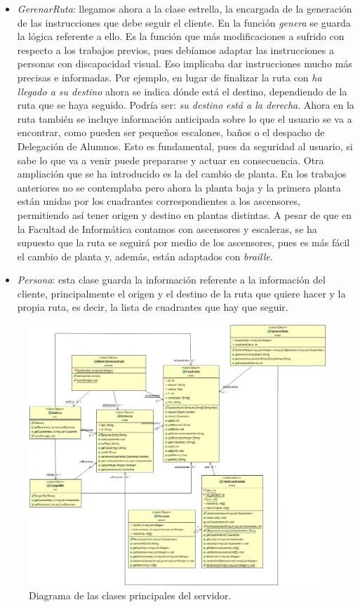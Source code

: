 \begin{itemize}
	\item \textit{GerenarRuta}: llegamos ahora a la clase estrella, la encargada de la generación de las instrucciones que debe seguir el cliente. En la función \textit{genera} se guarda la lógica referente a ello. Es la función que más modificaciones a sufrido con respecto a los trabajos previos, pues debíamos adaptar las instrucciones a personas con discapacidad visual. Eso implicaba dar instrucciones mucho más precisas e informadas. Por ejemplo, en lugar de finalizar la ruta con \textit{ha llegado a su destino} ahora se indica dónde está el destino, dependiendo de la ruta que se haya seguido. Podría ser: \textit{su destino está a la derecha}. Ahora en la ruta también se incluye información anticipada sobre lo que el usuario se va a encontrar, como pueden ser pequeños escalones, baños o el despacho de Delegación de Alumnos. Esto es fundamental, pues da seguridad al usuario, si sabe lo que va a venir puede prepararse y actuar en consecuencia. Otra ampliación que se ha introducido es la del cambio de planta. En los trabajos anteriores no se contemplaba pero ahora la planta baja y la primera planta están unidas por los cuadrantes correspondientes a los ascensores, permitiendo así tener origen y destino en plantas distintas. A pesar de que en la Facultad de Informática contamos con ascensores y escaleras, se ha supuesto que la ruta se seguirá por medio de los ascensores, pues es más fácil el cambio de planta y, además, están adaptados con \textit{braille}.
	
	\item \textit{Persona}: esta clase guarda la información referente a la información del cliente, principalmente el origen y el destino de la ruta que quiere hacer y la propia ruta, es decir, la lista de cuadrantes que hay que seguir.
\end{itemize}


\begin{figure}[t]
	\centering
	\includegraphics[width=1.1\textwidth]{Imagenes/Capitulo4/diagramServer}
	\caption{Diagrama de las clases principales del servidor.}
	\label{fig:diagServ}
\end{figure}




